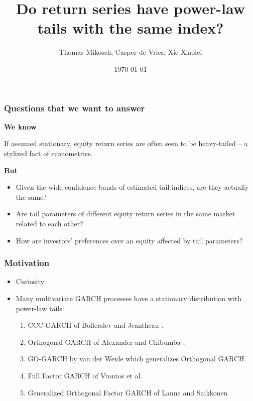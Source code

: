 \documentclass{beamer}
\title{Do return series have power-law tails with the same index?}
\author{Thomas Mikosch, Casper de Vries, Xie Xiaolei} %
\institute[UCPH] %
{
University of Copenhagen \\ %
\medskip
\textit{xie@math.ku.dk} %
}
\date{\today} %
\begin{document}
\begin{frame}
\titlepage %
\end{frame}


\begin{frame}
  \frametitle{Questions that we want to answer}
  \textcolor[HTML]{990033}{\bf We know}

  If assumed stationary, equity return series are often seen to be
  heavy-tailed -- a stylized fact of econometrics.
  
  \textcolor[HTML]{990033}{\bf But}
  \begin{itemize}
    \item Given the wide confidence bands of estimated tail indices,
      are they actually the same?
    \item Are tail parameters of different equity return series in the same
      market related to each other?
    \item How are investors' preferences over an equity affected by
      tail parameters?
  \end{itemize}
\end{frame}

\begin{frame}
  \frametitle{Motivation}
  \begin{itemize}
  \item Curiosity
    \item Many multivariate GARCH processes have a stationary
      distribution with power-law tails:
      \begin{enumerate}
        \item CCC-GARCH of Bollerslev \cite{bollerslev:1990} and
          Jeantheau \cite{jeantheau:1998}.
        \item Orthogonal GARCH of
          Alexander and Chibumba \cite{alexander:chibumba:1996},
        \item GO-GARCH by van der Weide \cite{Weide2002} which
          generalizes Orthogonal GARCH.
        \item Full Factor GARCH of Vrontos et
          al. \cite{vrontos2003full}
        \item Generalized Orthogonal Factor GARCH of Lanne and
          Saikkonen  \cite{lanne2007modelling}
      \end{enumerate}
  \end{itemize}
\end{frame}
\end{document}
